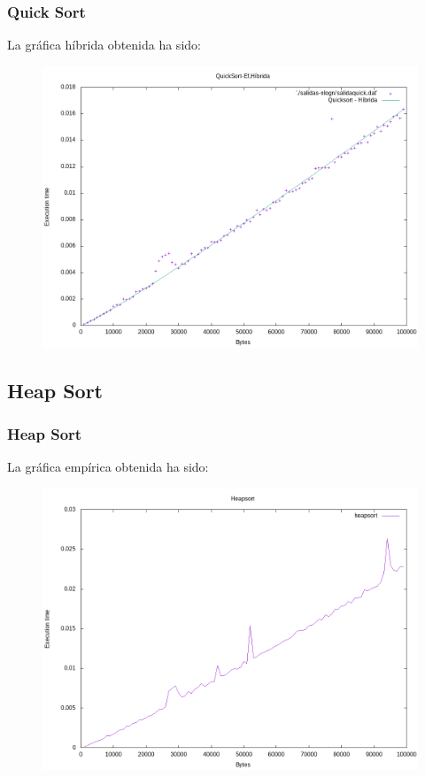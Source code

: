 \documentclass{beamer}
\begin{document}
\begin{frame}
	\frametitle{Quick Sort}
	La gráfica híbrida obtenida ha sido:
	\begin{figure}
		\centering
		\includegraphics[width=0.7\linewidth]{imagenes/quicksort-hibrida.png}
		\caption{}
		\label{fig:E5}
	\end{figure}
\end{frame}
\subsection{Heap Sort}
\begin{frame}
	\frametitle{Heap Sort}
	La gráfica empírica obtenida ha sido:
	\begin{figure}
		\centering
		\includegraphics[width=0.7\linewidth]{imagenes/heapsort.png}
		\caption{}
		\label{fig:E4}
	\end{figure}
	
\end{frame}
\end{document}

